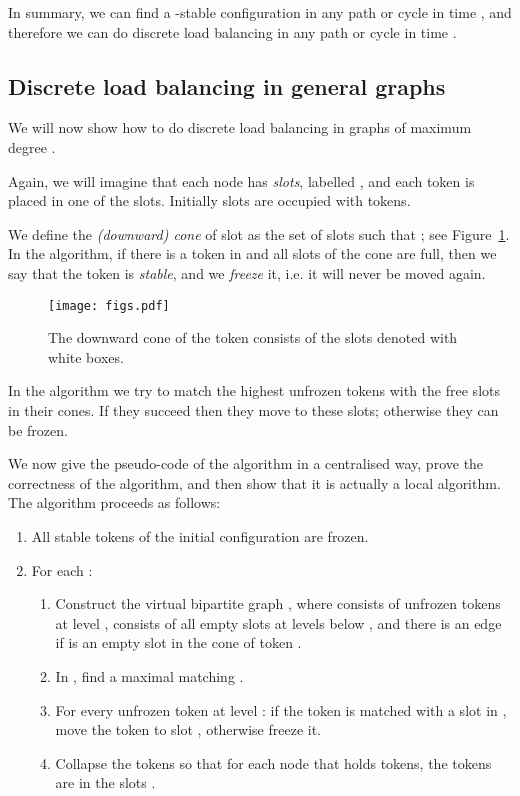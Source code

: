 In summary, we can find a -stable configuration in any path or cycle in time , and therefore we can do discrete load balancing in any path or cycle in time .


\subsection{Discrete load balancing in general graphs}\label{ssec:pos-discrete}

We will now show how to do discrete load balancing in graphs of maximum degree .

\thmposdiscrete*

Again, we will imagine that each node  has  \emph{slots}, labelled , and each token is placed in one of the slots. Initially slots  are occupied with tokens.

We define the \emph{(downward) cone}  of slot  as the set of slots  such that ; see Figure~\ref{fig:cone}. In the algorithm, if there is a token in  and all slots of the cone  are full, then we say that the token is \emph{stable}, and we \emph{freeze} it, i.e. it will never be moved again.

\begin{figure}[ht]
    \centering
    \texttt{[image: figs.pdf]}
    \caption{The downward cone  of the token  consists of the slots denoted with white boxes.}\label{fig:cone}
\end{figure}

In the algorithm we try to match the highest unfrozen tokens with the free slots in their cones. If they succeed then they move to these slots; otherwise they can be frozen.

We now give the pseudo-code of the algorithm in a centralised way, prove the correctness of the algorithm, and then show that it is actually a local algorithm. The algorithm proceeds as follows:
\begin{enumerate}
	\item All stable tokens of the initial configuration are frozen.
	\item For each :
	\begin{enumerate}
		\item Construct the virtual bipartite graph , where  consists of unfrozen tokens at level ,  consists of all empty slots at levels below , and there is an edge  if  is an empty slot in the cone of token .
		\item In , find a maximal matching .
		\item For every unfrozen token  at level : if the token is matched with a slot  in , move the token to slot , otherwise freeze it. 
		\item Collapse the tokens so that for each node  that holds  tokens, the tokens are in the slots .
	\end{enumerate}
\end{enumerate} 

